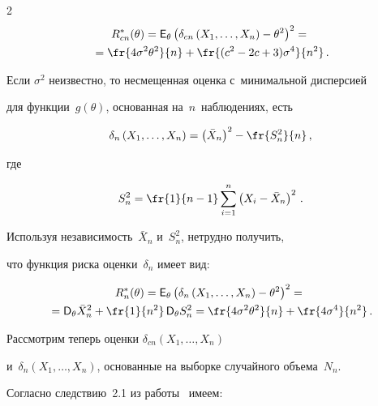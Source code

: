 \begin{multicols}{2}
\begin{multline}


R^*_{cn}(\theta) = {\sf E}_\theta \left(\delta_{cn}\left(X_1,\ldots,X_n\right) - 


\theta^2\right)^2 = {}\\


{}=\fr{4 \sigma^2\theta^2}{n} + 


\fr{(c^2 - 2c + 3) \sigma^4}{n^2}\,.\label{e2.2}


\end{multline}


Если $\sigma^2$ неизвестно, то несмещенная оценка с~минимальной дисперсией 


для функции~$g(\theta)$, основанная на~$n$~наблюдениях, есть


\begin{equation*}


\delta_{n}\left(X_1,\ldots,X_n\right) = \left(\bar X_n\right)^2 - 


\fr{S^2_n}{n}\,, %


\end{equation*}


где


$$


S^2_n = \fr{1}{n-1} \sum\limits_{i=1}^n \left(X_i - \bar X_n\right)^2\,.


$$


Используя независимость~$\bar X_n$ и~$S_n^2$, нетрудно получить, 


что функция риска оценки~$\delta_n$ имеет вид:


\begin{multline*}


R^*_{n}(\theta) = {\sf E}_\theta \left(\delta_{n}\left(X_1,\ldots,X_n\right) - 


\theta^2\right)^2 = {}\\


{}={\sf D}_\theta \bar X_n^2 + \fr{1}{n^2}\, 


{\sf D}_\theta S_n^2 =


\fr{4\sigma^2\theta^2}{n} + \fr{4\sigma^4}{n^2}\,. %


\end{multline*}


Рассмотрим теперь оценки $\delta_{cn}(X_1,\ldots,X_n)$ 


и~$\delta_{n}(X_1,\ldots,X_n)$, основанные на выборке случайного объема~$N_n$. 


Согласно следствию~2.1 из работы~\cite{2-ben} имеем:



\end{multicols}
